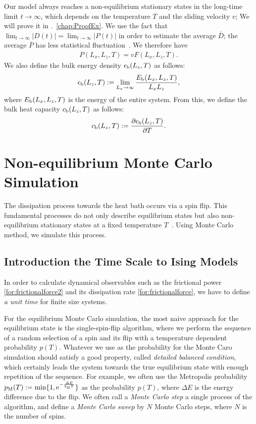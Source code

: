 Our model always reaches a non-equilibrium stationary states in the long-time limit $t\to\infty$, which depends on the temperature $T$ and the sliding velocity $v$; We will prove it in .~\ref{chap:ProofEx}. We use the fact that $\lim_{t\to\infty}|D(t)|=\lim_{t\to\infty}|P(t)|$ in order to estimate the average $\bar{D}$; the average $\bar{P}$ has less statistical fluctuation~\cite{Magiera2009a, Magiera2011, Magiera2011b}. We therefore have
\begin{align}
P(L_{x}, L_{z}, T)=vF(L_{x}, L_{z}, T)\label{for:frictionalforce2}.
\end{align}
We also define the bulk energy density $\epsilon_{\rm b}(L_{z}, T)$ as follows:
\begin{align}
\epsilon_{\rm b}(L_{z}, T):=\lim_{L_{x}\to\infty}\frac{E_{\rm b}(L_{x}, L_{z}, T)}{L_{x}L_{z}},
\end{align}
where $E_{\rm b}(L_{x}, L_{z}, T)$ is the energy of the entire system. From this, we define the bulk heat capacity $c_{\rm b}(L_{z}, T)$ as follows:
\begin{align}
c_{\rm b}(L_{z}, T):=\frac{\partial \epsilon_{\rm b}(L_{z}, T)}{\partial T}.
\end{align}

\section{Non-equilibrium Monte Carlo Simulation}
The dissipation process towards the heat bath occurs via a spin flip. This fundamental processes do not only describe equilibrium states but also non-equilibrium stationary states at a fixed temperature $T$~\cite{Glauber1963}. Using Monte Carlo method, we simulate this process.

\subsection{Introduction the Time Scale to Ising Models}
In order to calculate dynamical observables such as the frictional power \eqref{for:frictionalforce2} and its dissipation rate \eqref{for:frictionalforce}, we have to define \textit{a unit time} for finite size systems. 

For the equilibrium Monte Carlo simulation, the most naive approach for the equilibrium state is the single-spin-flip algorithm, where we perform the sequence of a random selection of a spin and its flip with a temperature dependent probability $p(T)$. Whatever we use as the probability for the Monte Caro simulation should satisfy a good property, called \textit{detailed balanced condition}, which certainly leads the system towards the true equilibrium state with enough repetition of the sequence. For example, we often use the Metropolis probability $p_{\rm M}(T):=\min\{1,\mathrm{e}^{-\frac{\Delta E}{k_{\rm B}T}}\}$ as the probability $p(T)$, where $\Delta E$ is the energy difference due to the flip. We often call a \textit{Monte Carlo step} a single process of the algorithm, and define a \textit{Monte Carlo sweep} by $N$ Monte Carlo steps, where $N$ is the number of spins.

